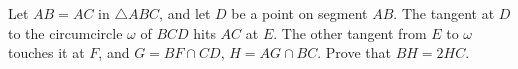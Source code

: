 Let $AB=AC$ in $\triangle ABC$, and let $D$ be a point on segment $AB$. The tangent at $D$ to the circumcircle $\omega$ of $BCD$ hits $AC$ at $E$. The other tangent from $E$ to $\omega$ touches it at $F$, and $G=BF \cap CD$, $H=AG \cap BC$. Prove that $BH=2HC$.

